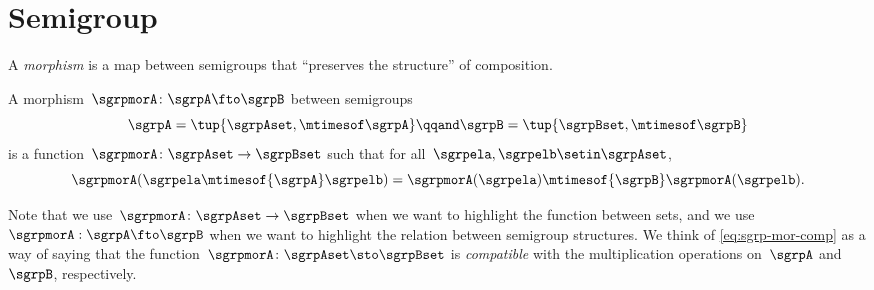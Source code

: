 

\section{Semigroup \wHomos}
\label{sec:semigroup-morphisms}

A \emph{morphism} is a map between semigroups that ``preserves the structure'' of composition.



\begin{ctdefinition}
    \label{def:semigroup-mor}
    A morphism~$\sgrpmorA\colon \sgrpA \fto \sgrpB$ between semigroups
    \begin{equation}
        \label{eq:sgrpAB}
        \sgrpA = \tup{\sgrpAset, \mtimesof\sgrpA}
        \qqand
        \sgrpB = \tup{\sgrpBset, \mtimesof\sgrpB}
    \end{equation}
    is a function~$\sgrpmorA\colon \sgrpAset \to \sgrpBset$ such that for all~$\sgrpela, \sgrpelb \setin \sgrpAset$,
    \begin{equation}
        \label{eq:sgrp-mor-comp}
        \sgrpmorA(\sgrpela \mtimesof{\sgrpA} \sgrpelb) = \sgrpmorA (\sgrpela) \mtimesof{\sgrpB} \sgrpmorA(\sgrpelb).
    \end{equation}
\end{ctdefinition}

Note that we use~$\sgrpmorA\colon \sgrpAset \to \sgrpBset$ when we want to highlight the function between sets, and we use~$\sgrpmorA: \sgrpA \fto \sgrpB$ when we want to highlight the relation between semigroup structures.
We think of \cref{eq:sgrp-mor-comp} as a way of saying that the function~$\sgrpmorA\colon \sgrpAset \sto \sgrpBset$  is \emph{compatible} with the multiplication operations on~$\sgrpA$ and~$\sgrpB$, respectively.

